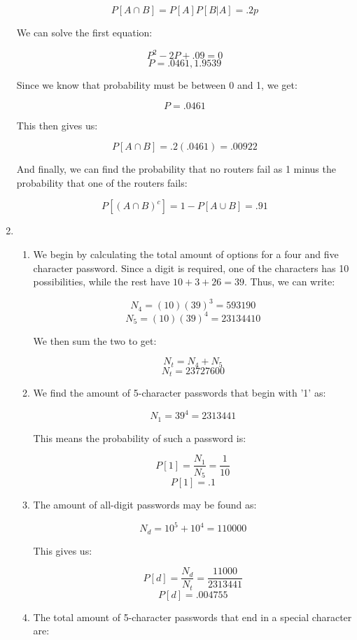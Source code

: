 \begin{enumerate}
    $$P[A\cap B]=P[A]P[B|A]=.2p$$

    We can solve the first equation:

    $$P^2-2P+.09=0$$
    $$P=.0461,1.9539$$

    Since we know that probability must be between 0 and 1, we get:

    $$\boxed{P=.0461}$$

    This then gives us:

    $$\boxed{P[A\cap B]=.2(.0461)=.00922}$$

    And finally, we can find the probability that no routers fail as 1 minus the probability that one of the routers fails:

    $$\boxed{P[(A\cap B)^c]=1-P[A\cup B]=.91}$$

  \item

    \begin{enumerate}

      \item We begin by calculating the total amount of options for a four and five character password. Since a digit is required, one of the characters has 10 possibilities, while the rest have $10+3+26=39$. Thus, we can write:

        $$N_4=(10)(39)^3=593190$$
        $$N_5=(10)(39)^4=23134410$$

        We then sum the two to get:

        $$N_t=N_4+N_5$$
        $$\boxed{N_t=23727600}$$

      \item We find the amount of 5-character passwords that begin with '1' as:

        $$N_1=39^4=2313441$$

        This means the probability of such a password is:

        $$P[1]=\frac{N_1}{N_5}=\frac{1}{10}$$
        $$\boxed{P[1]=.1}$$

      \item The amount of all-digit passwords may be found as:

        $$N_d=10^5+10^4=110000$$

        This gives us:

        $$P[d]=\frac{N_d}{N_t}=\frac{11000}{2313441}$$
        $$\boxed{P[d]=.004755}$$

      \item The total amount of 5-character passwords that end in a special character are:


\end{enumerate}
\end{enumerate}
